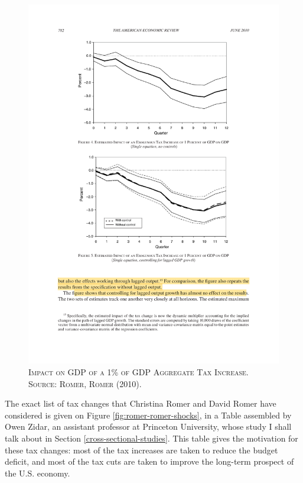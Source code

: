 \documentclass[]{book}
\begin{document}
\begin{figure}

{\centering \includegraphics[width=0.8\linewidth,height=0.8\textheight]{figures/RomerRomer2010/fig4} 

}

\caption{\textsc{Impact on GDP of a 1\% of GDP Aggregate
Tax Increase. Source: Romer, Romer (2010).}}\label{fig:romer-romer-fig4}
\end{figure}

The exact list of tax changes that Christina Romer and David Romer have
considered is given on Figure \ref{fig:romer-romer-shocks}, in a Table
assembled by Owen Zidar, an assistant professor at Princeton University,
whose study I shall talk about in Section \ref{cross-sectional-studies}.
This table gives the motivation for these tax changes: most of the tax
increases are taken to reduce the budget deficit, and most of the tax
cuts are taken to improve the long-term prospect of the U.S. economy.
\end{document}
